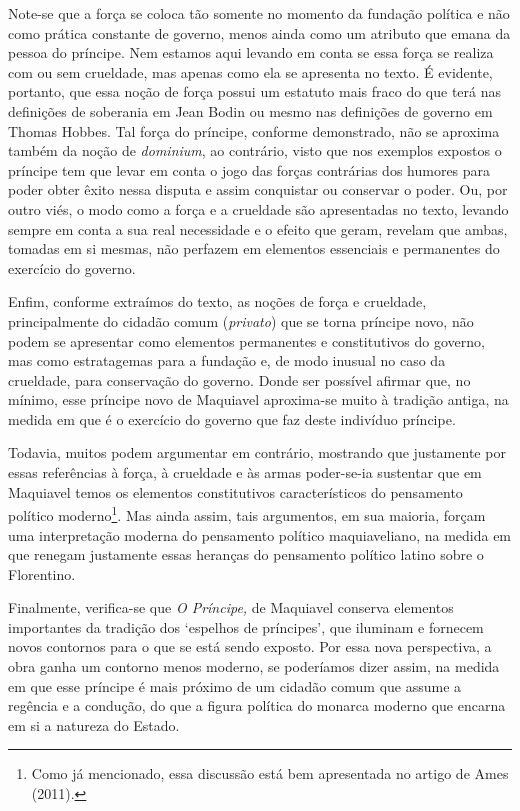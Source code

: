 Note-se que a força se coloca tão somente no momento da fundação
política e não como prática constante de governo, menos ainda como um
atributo que emana da pessoa do príncipe. Nem estamos aqui levando em
conta se essa força se realiza com ou sem crueldade, mas apenas como ela
se apresenta no texto. É evidente, portanto, que essa noção de força
possui um estatuto mais fraco do que terá nas definições de soberania em
Jean Bodin ou mesmo nas definições de governo em Thomas Hobbes. Tal
força do príncipe, conforme demonstrado, não se aproxima também da noção
de \emph{dominium}, ao contrário, visto que nos exemplos expostos o
príncipe tem que levar em conta o jogo das forças contrárias dos humores
para poder obter êxito nessa disputa e assim conquistar ou conservar o
poder. Ou, por outro viés, o modo como a força e a crueldade são
apresentadas no texto, levando sempre em conta a sua real necessidade e
o efeito que geram, revelam que ambas, tomadas em si mesmas, não
perfazem em elementos essenciais e permanentes do exercício do governo.

Enfim, conforme extraímos do texto, as noções de força e crueldade,
principalmente do cidadão comum (\emph{privato}) que se torna príncipe
novo, não podem se apresentar como elementos permanentes e constitutivos
do governo, mas como estratagemas para a fundação e, de modo inusual no
caso da crueldade, para conservação do governo. Donde ser possível
afirmar que, no mínimo, esse príncipe novo de Maquiavel aproxima-se
muito à tradição antiga, na medida em que é o exercício do governo que
faz deste indivíduo príncipe.

Todavia, muitos podem argumentar em contrário, mostrando que justamente
por essas referências à força, à crueldade e às armas poder-se-ia
sustentar que em Maquiavel temos os elementos constitutivos
característicos do pensamento político moderno\footnote{Como já
  mencionado, essa discussão está bem apresentada no artigo de Ames
  (2011).}. Mas ainda assim, tais argumentos, em sua maioria, forçam uma
interpretação moderna do pensamento político maquiaveliano, na medida em
que renegam justamente essas heranças do pensamento político latino
sobre o Florentino.

Finalmente, verifica-se que \emph{O Príncipe,} de Maquiavel conserva
elementos importantes da tradição dos `espelhos de príncipes', que
iluminam e fornecem novos contornos para o que se está sendo exposto.
Por essa nova perspectiva, a obra ganha um contorno menos moderno, se
poderíamos dizer assim, na medida em que esse príncipe é mais próximo de
um cidadão comum que assume a regência e a condução, do que a figura
política do monarca moderno que encarna em si a natureza do Estado.

